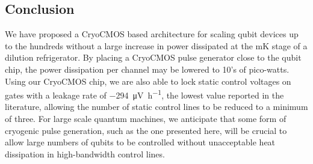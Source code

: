 \subsection{Conclusion}
We have proposed a CryoCMOS based architecture for scaling qubit devices up to the hundreds without a large increase in power dissipated at the mK stage of a dilution refrigerator. By placing a CryoCMOS pulse generator close to the qubit chip, the power dissipation per channel may be lowered to 10's of pico-watts. Using our CryoCMOS chip, we are also able to lock static control voltages on gates with a leakage rate of \SI{-294}{\micro\volt\per\hour}, the lowest value reported in the literature, allowing the number of static control lines to be reduced to a minimum of three. For large scale quantum machines, we anticipate that some form of cryogenic pulse generation, such as the one presented here, will be crucial to allow large numbers of qubits to be controlled without unacceptable heat dissipation in high-bandwidth control lines.
